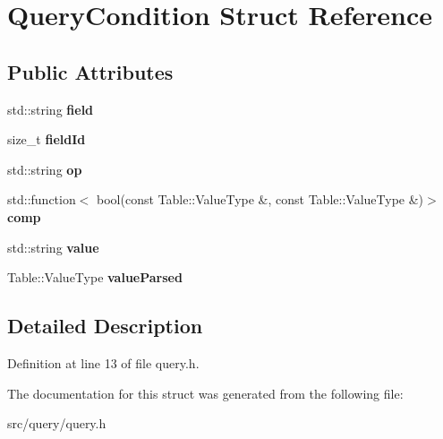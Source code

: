 \hypertarget{struct_query_condition}{}\section{Query\+Condition Struct Reference}
\label{struct_query_condition}
\subsection*{Public Attributes}
\begin{DoxyCompactItemize}
\item 
\mbox{\label{struct_query_condition_a9441d3fa04f156825bc33c8e0280f27a}} 
std\+::string {\bfseries field}
\item 
\mbox{\label{struct_query_condition_a12014c8d10ec2042f2af25ed26c57da7}} 
size\+\_\+t {\bfseries field\+Id}
\item 
\mbox{\label{struct_query_condition_ad0d839658ed0d6fcfcf7269d758a0026}} 
std\+::string {\bfseries op}
\item 
\mbox{\label{struct_query_condition_a7789196c7812945074ed4274cb727522}} 
std\+::function$<$ bool(const Table\+::\+Value\+Type \&, const Table\+::\+Value\+Type \&)$>$ {\bfseries comp}
\item 
\mbox{\label{struct_query_condition_a9e92d6feb510b6802814b2b188cd334a}} 
std\+::string {\bfseries value}
\item 
\mbox{\label{struct_query_condition_aa6171a7b8cb2482381b9de2bb5e8c191}} 
Table\+::\+Value\+Type {\bfseries value\+Parsed}
\end{DoxyCompactItemize}


\subsection{Detailed Description}


Definition at line 13 of file query.\+h.



The documentation for this struct was generated from the following file\+:\begin{DoxyCompactItemize}
\item 
src/query/query.\+h\end{DoxyCompactItemize}
